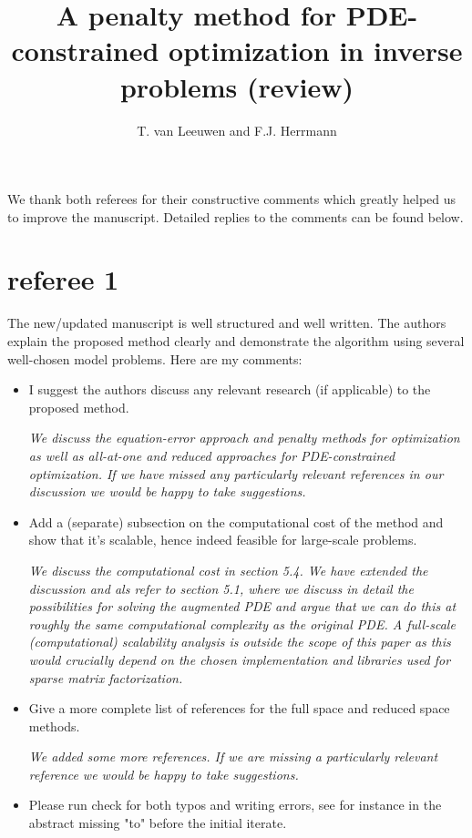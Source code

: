 \documentclass[12pt]{article}
\begin{document}
 
\title{A penalty method for PDE-constrained optimization in inverse problems (review)} 
\author{T. van Leeuwen and F.J. Herrmann} 
\date{} 
\maketitle 
\clearpage

We thank both referees for their constructive comments which greatly helped us to improve the manuscript. Detailed replies to the comments can be found below.

\section{referee 1}
The new/updated manuscript is well structured and well written. The authors explain the proposed method clearly and demonstrate the algorithm using several well-chosen model problems. Here are my comments: 

\begin{itemize}
\item I suggest the authors discuss any relevant research (if applicable) to the proposed method. 

\vspace{5mm}\emph{We discuss the equation-error approach and penalty methods for optimization as well as all-at-one and reduced approaches for PDE-constrained optimization. If we have missed any particularly relevant references in our discussion we would be happy to take suggestions.}


\item Add a (separate) subsection on the computational cost of the method and show that it's scalable, hence indeed feasible for large-scale problems. 

\vspace{5mm}
\emph{We discuss the computational cost in section 5.4. We have extended the discussion and als refer to section 5.1, where we discuss in detail the possibilities for solving the augmented PDE and argue that we can do this at roughly the same computational complexity as the original PDE. A full-scale (computational) scalability analysis is outside the scope of this paper as this would crucially depend on the chosen implementation and libraries used for sparse matrix factorization.}

\item Give a more complete list of references for the full space and reduced space methods. 

\vspace{5mm}
\emph{We added some more references. If we are missing a particularly relevant reference we would be happy to take suggestions.}


\item Please run check for both typos and writing errors, see for instance in the abstract missing "to" before the initial iterate. 
\end{itemize}
\clearpage
\end{document}
